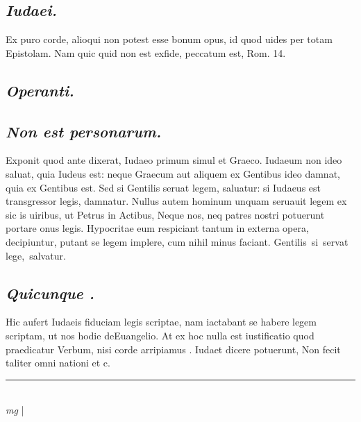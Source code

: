 \documentclass{article}
\begin{document}
\begin{pages}
\subsection*{\textit{Iudaei. }}\pstart Ex puro corde, alioqui non potest esse bonum opus, id quod uides per totam Epistolam. Nam quic quid non est exfide, peccatum est, Rom. 14.   \pend
{}
{}
\subsection*{\textit{Operanti. }}
{}
\subsection*{\textit{Non est personarum. }}\pstart Exponit quod ante dixerat, Iudaeo primum simul et Graeco. Iudaeum non ideo saluat, quia Iudeus est: neque Graecum aut aliquem ex Gentibus ideo damnat, quia ex Gentibus est. Sed si Gentilis seruat legem, saluatur: si Iudaeus est transgressor legis, damnatur.  Nullus autem hominum unquam seruauit legem ex sic is uiribus, ut Petrus in Actibus, Neque nos, neq patres nostri potuerunt portare onus legis. Hypocritae eum respiciant tantum in externa opera, decipiuntur, putant se legem implere, cum nihil minus faciant.  Gentilis si servat lege, salvatur.   \pend
{}
{}
\subsection*{\textit{Quicunque . }}\pstart Hic aufert Iudaeis fiduciam legis scriptae, nam iactabant se habere legem scriptam, ut nos hodie deEuangelio. At ex hoc nulla est iustificatio quod praedicatur Verbum, nisi corde arripiamus . Iudaet dicere potuerunt, Non fecit taliter omni nationi et c.   \pend
\vspace{0.5cm}\noindent
\vspace{0.2cm}\rule{1cm}{0.2pt}\\ 
\hspace{0.2cm}\textit{mg}
\footnotesize 
\normalsize| 

\end{pages}
\end{document}
